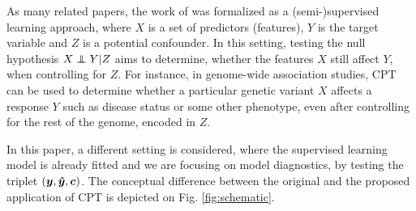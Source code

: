 \documentclass{article}
\begin{document}
As many related papers, the work of \cite{berrett2020conditional} was formalized as a (semi-)supervised learning approach, where $X$ is a set of predictors (features), $Y$ is the target variable and $Z$ is a potential confounder. In this setting, testing the null hypothesis $X \independent Y | Z$ aims to determine, whether the features $X$ still affect $Y$, when controlling for $Z$.
For instance, in genome-wide association studies, CPT can be used to determine whether a particular genetic variant $X$ affects a response $Y$ such as disease status or some other phenotype, even after controlling for the rest of the genome, encoded in $Z$.

In this paper, a different setting is considered, where the supervised learning model is already fitted and we are focusing on model diagnostics, by testing the triplet $(\boldsymbol{y},\boldsymbol{\hat{y}}, \boldsymbol{c})$. 
The conceptual difference between the original and the proposed application of CPT is depicted on Fig. \ref{fig:schematic}.
\end{document}
